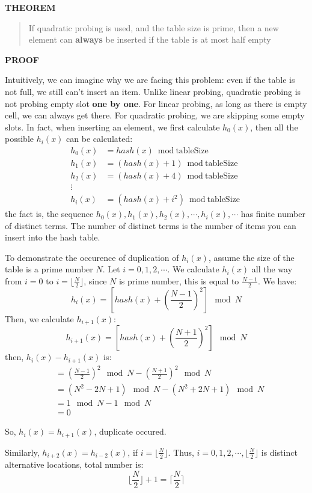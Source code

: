 \documentclass[12pt]{book}
\begin{document}
\textbf{THEOREM}
\begin{quote}
If quadratic probing is used, and the table size is prime, then a new element can \textbf{always} be inserted if the table is at most half empty
\end{quote}

\textbf{PROOF}

Intuitively, we can imagine why we are facing this problem: even if the table is not full, we still can't insert an item. Unlike linear probing, quadratic probing is not probing empty slot \textbf{one by one}. For linear probing, as long as there is empty cell, we can always get there. For quadratic probing, we are skipping some empty slots. In fact, when inserting an element, we first calculate \(h_0(x)\), then all the possible \(h_i(x)\) can be calculated:
\begin{align*}
h_0(x) &= hash(x) \bmod \text{tableSize} \\
h_1(x) &= (hash(x) + 1) \bmod \text{tableSize} \\
h_2(x) &= (hash(x) + 4) \bmod \text{tableSize} \\
\vdots \\
h_i(x) &= (hash(x) + i^2) \bmod \text{tableSize}
\end{align*}
the fact is, the sequence \(h_0(x), h_1(x), h_2(x), \cdots, h_i(x), \cdots\) has finite number of distinct terms. The number of distinct terms is the number of items you can insert into the hash table.

To demonstrate the occurence of duplication of \(h_i(x)\), assume the size of the table is a prime number \(N\). Let \(i = 0,1,2,\cdots\). We calculate \(h_i(x)\) all the way from \(i = 0\) to \(i = \lfloor \frac {N} {2} \rfloor\), since \(N\) is prime number, this is equal to \(\frac {N - 1} {2}\). We have:
\[
h_i(x) = [hash(x) + (\frac {N - 1} {2})^2] \mod N
\]
Then, we calculate \(h_{i + 1}(x)\):
\[
h_{i + 1}(x) = [hash(x) + (\frac {N + 1} {2})^2] \mod N
\]
then, \(h_i(x) - h_{i + 1}(x)\) is:
\begin{align*}
&= (\frac {N - 1} {2})^2 \mod N - (\frac {N + 1} {2})^2 \mod N \\
&= (N^2 - 2N + 1) \mod N - (N^2 + 2N + 1) \mod N \\
&= 1 \mod N - 1 \mod N \\
&= 0
\end{align*}

So, \(h_i(x) = h_{i + 1}(x)\), duplicate occured.

Similarly, \(h_{i + 2}(x) = h_{i - 2}(x)\), if \(i = \lfloor \frac {N} {2} \rfloor\). Thus, \(i = 0,1,2, \cdots, \lfloor \frac {N} {2} \rfloor\) is distinct alternative locations, total number is:
\[
\lfloor \frac {N} {2} \rfloor + 1 = \lceil \frac {N} {2} \rceil
\]
\end{document}
